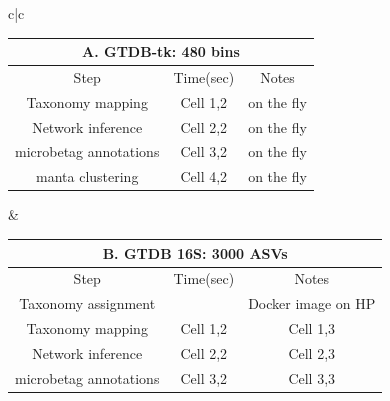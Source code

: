 \documentclass[sn-mathphys,Numbered, lineno]{sn-jnl}  %
\theoremstyle{thmstyleone}%
\theoremstyle{thmstyletwo}%
\theoremstyle{thmstylethree}%
\begin{document}
        \begin{table}[ht]

            \centering

            \begin{adjustbox}{width=1.3\textwidth,center=\textwidth}

            \begin{tabular}{c|c}

                \begin{tabular}{ccc}

                    \multicolumn{3}{c}{A. GTDB-tk: 480 bins} \\
                    \toprule
                    Step &  Time(sec) & Notes \\
                    \toprule

                    Taxonomy mapping & Cell 1,2 & on the fly \\

                    Network inference & Cell 2,2 & on the fly  \\

                    microbetag annotations & Cell 3,2 & on the fly \\

                    manta clustering & Cell 4,2 & on the fly \\

                \end{tabular} &

                \begin{tabular}{ccc}

                    \multicolumn{3}{c}{B. GTDB 16S: 3000 ASVs} \\
                    \toprule
                    Step &  Time(sec) & Notes \\
                    \toprule

                    Taxonomy assignment &  & Docker image on HP\protect\footnotemark \\

                    Taxonomy mapping & Cell 1,2 & Cell 1,3 \\

                    Network inference & Cell 2,2 & Cell 2,3 \\

                    microbetag annotations & Cell 3,2 & Cell 3,3 \\


\end{tabular}
\end{tabular}
\end{adjustbox}
\end{table}
\end{document}
